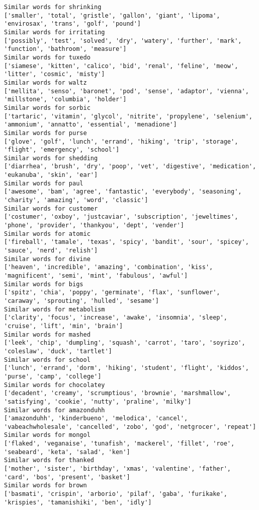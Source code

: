 \documentclass[11pt]{article}
\begin{document}
\begin{Verbatim}[commandchars=\\\{\}]
Similar words for shrinking
['smaller', 'total', 'gristle', 'gallon', 'giant', 'lipoma', 'envirosax', 'trans', 'golf', 'pound']
Similar words for irritating
['possibly', 'test', 'solved', 'dry', 'watery', 'further', 'mark', 'function', 'bathroom', 'measure']
Similar words for tuxedo
['siamese', 'kitten', 'calico', 'bid', 'renal', 'feline', 'meow', 'litter', 'cosmic', 'misty']
Similar words for waltz
['mellita', 'senso', 'baronet', 'pod', 'sense', 'adaptor', 'vienna', 'millstone', 'columbia', 'holder']
Similar words for sorbic
['tartaric', 'vitamin', 'glycol', 'nitrite', 'propylene', 'selenium', 'ammonium', 'annatto', 'essential', 'menadione']
Similar words for purse
['glove', 'golf', 'lunch', 'errand', 'hiking', 'trip', 'storage', 'flight', 'emergency', 'school']
Similar words for shedding
['diarrhea', 'brush', 'dry', 'poop', 'vet', 'digestive', 'medication', 'eukanuba', 'skin', 'ear']
Similar words for paul
['awesome', 'bam', 'agree', 'fantastic', 'everybody', 'seasoning', 'charity', 'amazing', 'word', 'classic']
Similar words for customer
['costumer', 'oxboy', 'justcaviar', 'subscription', 'jeweltimes', 'phone', 'provider', 'thankyou', 'dept', 'vender']
Similar words for atomic
['fireball', 'tamale', 'texas', 'spicy', 'bandit', 'sour', 'spicey', 'sauce', 'nerd', 'relish']
Similar words for divine
['heaven', 'incredible', 'amazing', 'combination', 'kiss', 'magnificent', 'semi', 'mint', 'fabulous', 'awful']
Similar words for bigs
['spitz', 'chia', 'poppy', 'germinate', 'flax', 'sunflower', 'caraway', 'sprouting', 'hulled', 'sesame']
Similar words for metabolism
['clarity', 'focus', 'increase', 'awake', 'insomnia', 'sleep', 'cruise', 'lift', 'min', 'brain']
Similar words for mashed
['leek', 'chip', 'dumpling', 'squash', 'carrot', 'taro', 'soyrizo', 'coleslaw', 'duck', 'tartlet']
Similar words for school
['lunch', 'errand', 'dorm', 'hiking', 'student', 'flight', 'kiddos', 'purse', 'camp', 'college']
Similar words for chocolatey
['decadent', 'creamy', 'scrumptious', 'brownie', 'marshmallow', 'satisfying', 'cookie', 'nutty', 'praline', 'milky']
Similar words for amazonduhh
['amazonduhh', 'kinderbueno', 'melodica', 'cancel', 'vabeachwholesale', 'cancelled', 'zobo', 'god', 'netgrocer', 'repeat']
Similar words for mongol
['flaked', 'veganaise', 'tunafish', 'mackerel', 'fillet', 'roe', 'seabeard', 'keta', 'salad', 'ken']
Similar words for thanked
['mother', 'sister', 'birthday', 'xmas', 'valentine', 'father', 'card', 'bos', 'present', 'basket']
Similar words for brown
['basmati', 'crispin', 'arborio', 'pilaf', 'gaba', 'furikake', 'krispies', 'tamanishiki', 'ben', 'idly']

\end{Verbatim}
\end{document}
